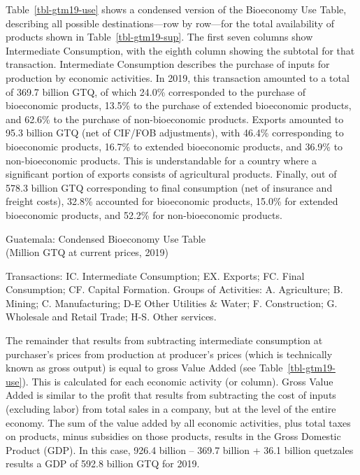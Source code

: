 \documentclass[
  letterpaper,
  DIV=11,
  numbers=noendperiod]{scrartcl}
\begin{document}
Table~\ref{tbl-gtm19-use} shows a condensed version of the Bioeconomy
Use Table, describing all possible destinations---row by row---for the
total availability of products shown in Table~\ref{tbl-gtm19-sup}. The
first seven columns show Intermediate Consumption, with the eighth
column showing the subtotal for that transaction. Intermediate
Consumption describes the purchase of inputs for production by economic
activities. In 2019, this transaction amounted to a total of 369.7
billion GTQ, of which 24.0\% corresponded to the purchase of bioeconomic
products, 13.5\% to the purchase of extended bioeconomic products, and
62.6\% to the purchase of non-bioeconomic products. Exports amounted to
95.3 billion GTQ (net of CIF/FOB adjustments), with 46.4\% corresponding
to bioeconomic products, 16.7\% to extended bioeconomic products, and
36.9\% to non-bioeconomic products. This is understandable for a country
where a significant portion of exports consists of agricultural
products. Finally, out of 578.3 billion GTQ corresponding to final
consumption (net of insurance and freight costs), 32.8\% accounted for
bioeconomic products, 15.0\% for extended bioeconomic products, and
52.2\% for non-bioeconomic products.

\begin{table}

\caption{\label{tbl-gtm19-use}Guatemala: Condensed Bioeconomy Use
Table\\
(Million GTQ at current prices, 2019)}


\end{table}%

Transactions: IC. Intermediate Consumption; EX. Exports; FC. Final
Consumption; CF. Capital Formation. Groups of Activities: A.
Agriculture; B. Mining; C. Manufacturing; D-E Other Utilities \& Water;
F. Construction; G. Wholesale and Retail Trade; H-S. Other services.

The remainder that results from subtracting intermediate consumption at
purchaser's prices from production at producer's prices (which is
technically known as gross output) is equal to gross Value Added (see
Table~\ref{tbl-gtm19-use}). This is calculated for each economic
activity (or column). Gross Value Added is similar to the profit that
results from subtracting the cost of inputs (excluding labor) from total
sales in a company, but at the level of the entire economy. The sum of
the value added by all economic activities, plus total taxes on
products, minus subsidies on those products, results in the Gross
Domestic Product (GDP). In this case, 926.4 billion -- 369.7 billion +
36.1 billion quetzales results a GDP of 592.8 billion GTQ for 2019.
\end{document}
